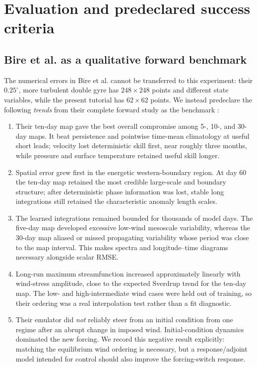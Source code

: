 \documentclass[11pt]{article}
\begin{document}
\section{Evaluation and predeclared success criteria}
\subsection{Bire et al. as a qualitative forward benchmark}

The numerical errors in Bire et al. cannot be transferred to this experiment: their
$0.25^\circ$, more turbulent double gyre has $248\times248$ points and different state
variables, while the present tutorial has $62\times62$ points.  We instead predeclare
the following \emph{trends} from their complete forward study as the benchmark
\cite{Bire2025}:
\begin{enumerate}
\item Their ten-day map gave the best overall compromise among 5-, 10-, and 30-day
  maps.  It beat persistence and pointwise time-mean climatology at useful short leads;
  velocity lost deterministic skill first, near roughly three months, while pressure
  and surface temperature retained useful skill longer.
\item Spatial error grew first in the energetic western-boundary region.  At day 60
  the ten-day map retained the most credible large-scale and boundary structure; after
  deterministic phase information was lost, stable long integrations still retained
  the characteristic anomaly length scales.
\item The learned integrations remained bounded for thousands of model days.  The
  five-day map developed excessive low-wind mesoscale variability, whereas the
  30-day map aliased or missed propagating variability whose period was close to the
  map interval.  This makes spectra and longitude--time diagrams necessary alongside
  scalar RMSE.
\item Long-run maximum streamfunction increased approximately linearly with wind-stress
  amplitude, close to the expected Sverdrup trend for the ten-day map.  The low- and
  high-intermediate wind cases were held out of training, so their ordering was a real
  interpolation test rather than a fit diagnostic.
\item Their emulator did \emph{not} reliably steer from an initial condition from one
  regime after an abrupt change in imposed wind.  Initial-condition dynamics dominated
  the new forcing.  We record this negative result explicitly: matching the equilibrium
  wind ordering is necessary, but a response/adjoint model intended for control should
  also improve the forcing-switch response.
\end{enumerate}
\end{document}
